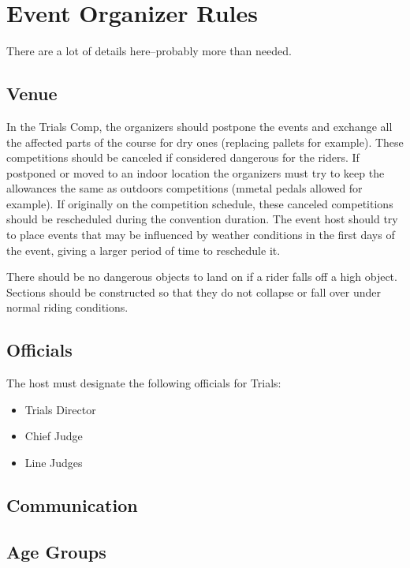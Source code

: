 \chapter{Event Organizer Rules}

\begin{comment2016}
There are a lot of details here--probably more than needed.
\end{comment2016}

\section{Venue}

In the Trials Comp, the organizers should postpone the events and exchange all the affected parts of the course for dry ones (replacing pallets for example).
These competitions should be canceled if considered dangerous for the riders.
If postponed or moved to an indoor location the organizers must try to keep the allowances the same as outdoors competitions (mmetal pedals allowed for example).
If originally on the competition schedule, these canceled competitions should be rescheduled during the convention duration.
The event host should try to place events that may be influenced by weather conditions in the first days of the event, giving a larger period of time to reschedule it.

There should be no dangerous objects to land on if a rider falls off a high object.
Sections should be constructed so that they do not collapse or fall over under normal riding conditions.

\section{Officials}

The host must designate the following officials for Trials:
\begin{itemize}
\item Trials Director
\item Chief Judge
\item Line Judges
\end{itemize}

\section{Communication}

\section{Age Groups}


